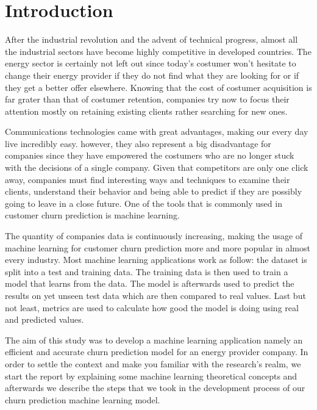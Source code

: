 \documentclass[LaM,binding=0.6cm, english]{sapthesis}
\begin{document}
\tableofcontents

\printnoidxglossaries

\listoffigures

\listoftables

\mainmatter

\chapter{Introduction}

\par After the industrial revolution and the advent of technical progress, almost all the industrial sectors have become highly competitive in developed countries. The energy sector is certainly not left out since today's costumer won't hesitate to change their energy provider if they do not find what they are looking for or if they get a better offer elsewhere. Knowing that the cost of costumer acquisition is far grater than that of costumer retention, companies try now to focus their attention mostly on retaining existing clients rather searching for new ones.

\par Communications technologies came with great advantages, making our every day live incredibly easy. however, they also represent a big disadvantage for companies since they have empowered the costumers who are no longer stuck with the decisions of a single company. Given that competitors are only one click away, companies must find interesting ways and techniques to examine their clients, understand their behavior and being able to predict if they are possibly going to leave in a close future. One of the tools that is commonly used in customer churn prediction is machine learning.

\par The quantity of companies data is continuously increasing, making the usage of machine learning for customer churn prediction more and more popular in almost every industry. Most machine learning applications work as follow: the dataset is split into a test and training data. The training data is then used to train a model that learns from the data. The model is afterwards used to predict the results on yet unseen test data which are then compared to real values. Last but not least, metrics are used to calculate how good the model is doing using real and predicted values.\cite{Geron2017}

\par The aim of this study was to develop a machine learning application namely an efficient and accurate churn prediction model for an energy provider company. In order to settle the context and make you familiar with the research's realm, we start the report by explaining some machine learning theoretical concepts and afterwards we describe the steps that we took in the development process of our churn prediction machine learning model.
\end{document}
